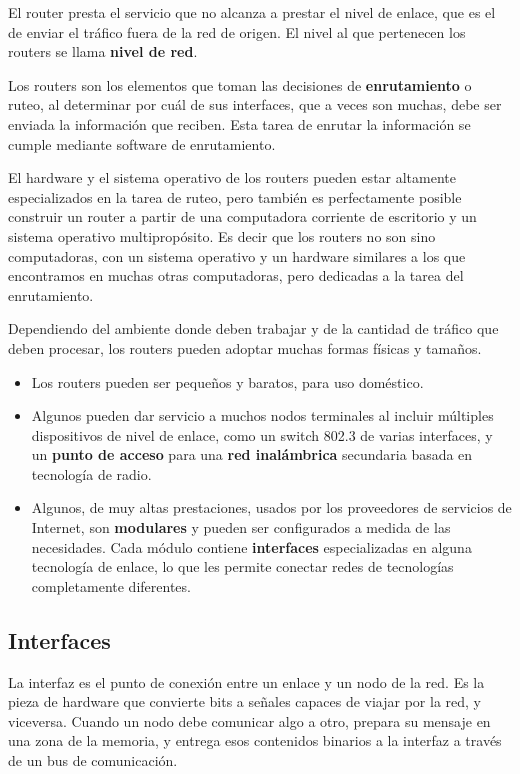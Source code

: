 \documentclass[spanish,a4paper,]{article}
\begin{document}
El router presta el servicio que no alcanza a prestar el nivel de
enlace, que es el de enviar el tráfico fuera de la red de origen. El
nivel al que pertenecen los routers se llama \textbf{nivel de red}.

Los routers son los elementos que toman las decisiones de
\textbf{enrutamiento} o ruteo, al determinar por cuál de sus interfaces,
que a veces son muchas, debe ser enviada la información que reciben.
Esta tarea de enrutar la información se cumple mediante software de
enrutamiento.

El hardware y el sistema operativo de los routers pueden estar altamente
especializados en la tarea de ruteo, pero también es perfectamente
posible construir un router a partir de una computadora corriente de
escritorio y un sistema operativo multipropósito. Es decir que los
routers no son sino computadoras, con un sistema operativo y un hardware
similares a los que encontramos en muchas otras computadoras, pero
dedicadas a la tarea del enrutamiento.

Dependiendo del ambiente donde deben trabajar y de la cantidad de
tráfico que deben procesar, los routers pueden adoptar muchas formas
físicas y tamaños.

\begin{itemize}
\item
  Los routers pueden ser pequeños y baratos, para uso doméstico.
\item
  Algunos pueden dar servicio a muchos nodos terminales al incluir
  múltiples dispositivos de nivel de enlace, como un switch 802.3 de
  varias interfaces, y un \textbf{punto de acceso} para una \textbf{red
  inalámbrica} secundaria basada en tecnología de radio.
\item
  Algunos, de muy altas prestaciones, usados por los proveedores de
  servicios de Internet, son \textbf{modulares} y pueden ser
  configurados a medida de las necesidades. Cada módulo contiene
  \textbf{interfaces} especializadas en alguna tecnología de enlace, lo
  que les permite conectar redes de tecnologías completamente
  diferentes.
\end{itemize}

\hypertarget{interfaces}{%
\subsection{Interfaces}\label{interfaces}}

La interfaz es el punto de conexión entre un enlace y un nodo de la red.
Es la pieza de hardware que convierte bits a señales capaces de viajar
por la red, y viceversa. Cuando un nodo debe comunicar algo a otro,
prepara su mensaje en una zona de la memoria, y entrega esos contenidos
binarios a la interfaz a través de un bus de comunicación.
\end{document}
